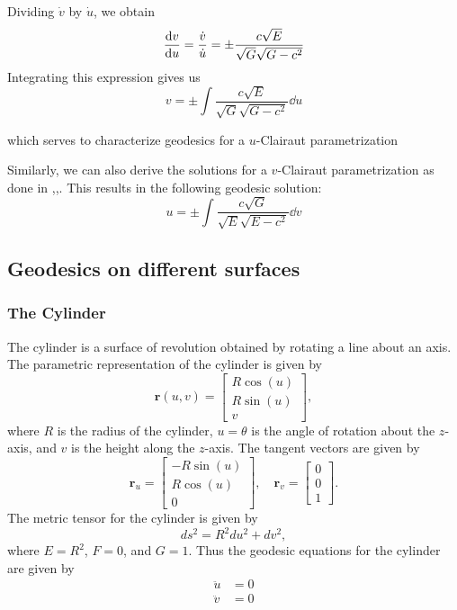 \documentclass[12pt]{article}
\begin{document}
Dividing $\dot{v}$ by $\dot{u}$, we obtain
\[
    \dv{v}{u} = \frac{\dot{v}}{\dot{u}} = \pm \frac{c\sqrt{E}}{\sqrt{G}\sqrt{G - c^{2}}} 
\]
Integrating this expression gives us
\begin{equation} \label{eq:v_Clairaut_integral}
    v = \pm \int \frac{c\sqrt{E}}{\sqrt{G}\sqrt{G - c^{2}}} \dd{u}
\end{equation}

which serves to characterize geodesics for a $u$-Clairaut parametrization

Similarly, we can also derive the solutions for a $v$-Clairaut parametrization as done in \cite{oprea2007differentialdifferential},\cite{rigatti2023characterizing},\cite{ramirez2001geodesics}.
This results in the following geodesic solution:
\begin{equation} \label{eq:u_Clairaut_integral}
	u = \pm \int \frac{c\sqrt{G}}{\sqrt{E}\sqrt{E - c^{2}}} \dd{v}
\end{equation}


\subsection{Geodesics on different surfaces}

\subsubsection{The Cylinder}
The cylinder is a surface of revolution obtained by rotating a line about an axis.
The parametric representation of the cylinder is given by
\[
	\mathbf{r}(u, v) = \begin{bmatrix} R \cos (u) \\ R \sin (u) \\ v \end{bmatrix},
\]
where \(R\) is the radius of the cylinder, \(u = \theta\) is the angle of rotation about the \(z\)-axis, and \(v\) is the height along the \(z\)-axis.
The tangent vectors are given by
\[
	\mathbf{r}_u = \begin{bmatrix} -R \sin (u) \\ R \cos (u) \\ 0 \end{bmatrix}, \quad \mathbf{r}_v = \begin{bmatrix} 0 \\ 0 \\ 1 \end{bmatrix}.
\]
The metric tensor for the cylinder is given by
\[
	ds^2 = R^2 du^2 + dv^2,
\]
where \(E = R^2\), \(F = 0\), and \(G = 1\).
Thus the geodesic equations for the cylinder are given by
\begin{align*}
	\ddot{u} &= 0 \\
	\ddot{v} &= 0
\end{align*}
\end{document}
